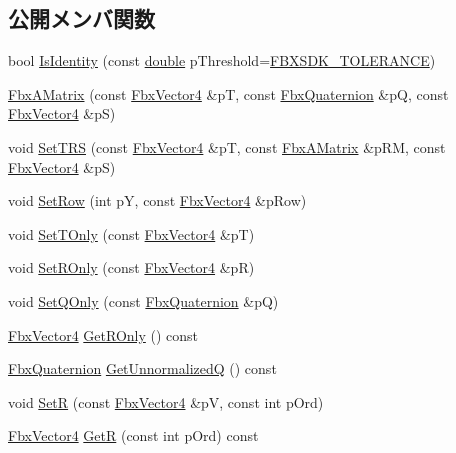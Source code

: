 \subsection*{公開メンバ関数}
\begin{DoxyCompactItemize}
\item 
bool \hyperlink{class_fbx_a_matrix_a785479d012314ec71198811c172ada98}{Is\+Identity} (const \hyperlink{class_fbx_a_matrix_ad463edbb9fea344643297701f159faa7}{double} p\+Threshold=\hyperlink{fbxtypes_8h_acf3cd6f208edb42ad9c9abbc1f7feea0}{F\+B\+X\+S\+D\+K\+\_\+\+T\+O\+L\+E\+R\+A\+N\+CE})
\item 
\hyperlink{class_fbx_a_matrix_aa8b1d55b46b3ef0298a55a9d64306f23}{Fbx\+A\+Matrix} (const \hyperlink{class_fbx_vector4}{Fbx\+Vector4} \&pT, const \hyperlink{class_fbx_quaternion}{Fbx\+Quaternion} \&pQ, const \hyperlink{class_fbx_vector4}{Fbx\+Vector4} \&pS)
\item 
void \hyperlink{class_fbx_a_matrix_ac3672896ac261b719176c423a46da152}{Set\+T\+RS} (const \hyperlink{class_fbx_vector4}{Fbx\+Vector4} \&pT, const \hyperlink{class_fbx_a_matrix}{Fbx\+A\+Matrix} \&p\+RM, const \hyperlink{class_fbx_vector4}{Fbx\+Vector4} \&pS)
\item 
void \hyperlink{class_fbx_a_matrix_a32ff707b8787c70a4cc4cf1c41c4caed}{Set\+Row} (int pY, const \hyperlink{class_fbx_vector4}{Fbx\+Vector4} \&p\+Row)
\item 
void \hyperlink{class_fbx_a_matrix_a69402e45f1b26360ac8e1f9e0dc6606c}{Set\+T\+Only} (const \hyperlink{class_fbx_vector4}{Fbx\+Vector4} \&pT)
\item 
void \hyperlink{class_fbx_a_matrix_abd514a59ce83ace8acf4d96bb1566c9e}{Set\+R\+Only} (const \hyperlink{class_fbx_vector4}{Fbx\+Vector4} \&pR)
\item 
void \hyperlink{class_fbx_a_matrix_acfba7a0ab3ab718ff1dc95e083bc5f31}{Set\+Q\+Only} (const \hyperlink{class_fbx_quaternion}{Fbx\+Quaternion} \&pQ)
\item 
\hyperlink{class_fbx_vector4}{Fbx\+Vector4} \hyperlink{class_fbx_a_matrix_a908a407eab72b8d71cf6c6ab9fa32e4f}{Get\+R\+Only} () const
\item 
\hyperlink{class_fbx_quaternion}{Fbx\+Quaternion} \hyperlink{class_fbx_a_matrix_aa6c9cff20dd3d26d5df852705a0ee149}{Get\+UnnormalizedQ} () const
\item 
void \hyperlink{class_fbx_a_matrix_a54374d0885fa0cf9ab2e619871cb000d}{SetR} (const \hyperlink{class_fbx_vector4}{Fbx\+Vector4} \&pV, const int p\+Ord)
\item 
\hyperlink{class_fbx_vector4}{Fbx\+Vector4} \hyperlink{class_fbx_a_matrix_ae36e44525e67b5a7076b9e2be733f456}{GetR} (const int p\+Ord) const

\end{DoxyCompactItemize}
